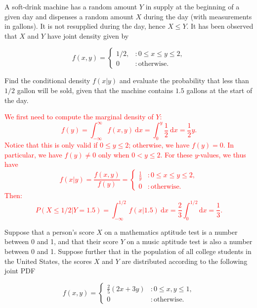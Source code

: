 \documentclass[12pt,reqno]{amsart}
\begin{document}
\prob A soft-drink machine has a random amount $Y$ in supply at the beginning of a given day and dispenses a random amount $X$ during the day (with measurements in gallons). It is not resupplied during the day, hence $X\leq Y$. It has been observed that $X$ and $Y$ have joint density given by

	\[
	f(x,y) = \begin{cases}
	1/2, & : 0 \leq x \leq y \leq 2, \\
	0 & : \text{otherwise}.
	\end{cases}
	\]

Find the conditional density $f(x|y)$ and evaluate the probability that less than $1/2$ gallon will be sold, given that the machine contains $1.5$ gallons at the start of the day.

\bigskip
\textcolor{red}{We first need to compute the marginal density of $Y$:
	\[
	f(y) = \int_{-\infty}^\infty f(x,y) \ \text{d}x = \int_0^y \frac{1}{2} \ \text{d}x = \frac{1}{2}y.
	\]
Notice that this is only valid if $0\leq y \leq 2$; otherwise, we have $f(y) = 0$. In particular, we have $f(y)\neq 0$ only when $0 < y \leq 2$. For these $y$-values, we thus have
	\[
	f(x|y) = \frac{f(x,y)}{f(y)} = \begin{cases}
	\frac{1}{y} & : 0 \leq x \leq y \leq 2, \\
	0 & : \text{otherwise}.
	\end{cases}
	\]
Then:
	\[
	P(X\leq 1/2 | Y = 1.5 ) = \int_{-\infty}^{1/2} f(x|1.5) \ \text{d} x = \frac{2}{3} \int_{0}^{1/2} \text{d}x = \frac{1}{3}.
	\]}
\bigskip












\prob Suppose that a person’s score $X$ on a mathematics aptitude test is a number between 0 and 1, and that their score $Y$ on a music aptitude test is also a number between 0 and 1. Suppose further that in the population of all college students in the United States, the scores $X$ and $Y$ are distributed according to the following joint PDF

	\[
	f(x,y) = \begin{cases}
	\frac{2}{5} (2x+3y) & : 0\leq x,y \leq 1, \\
	0 & : \text{otherwise}.
	\end{cases}
	\]
\end{document}
